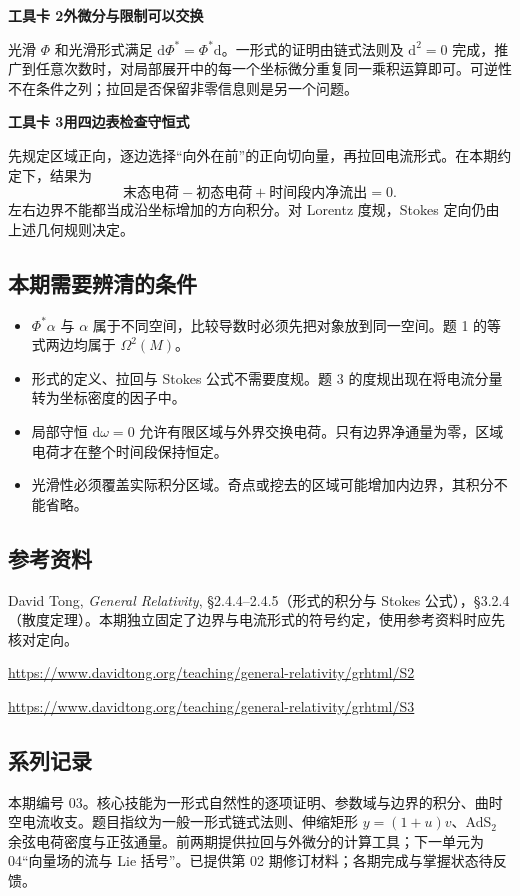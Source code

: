 \documentclass[11pt,a4paper]{article}
\newcommand{\D}{\mathrm d}
\begin{document}
\textbf{工具卡 2\quad 外微分与限制可以交换}\par
光滑 $\Phi$ 和光滑形式满足 $\D\Phi^*=\Phi^*\D$。一形式的证明由链式法则及 $\D^2=0$ 完成，推广到任意次数时，对局部展开中的每一个坐标微分重复同一乘积运算即可。可逆性不在条件之列；拉回是否保留非零信息则是另一个问题。

\textbf{工具卡 3\quad 用四边表检查守恒式}\par
先规定区域正向，逐边选择“向外在前”的正向切向量，再拉回电流形式。在本期约定下，结果为
\[
 \text{末态电荷}-\text{初态电荷}
 +\text{时间段内净流出}=0 .
\]
左右边界不能都当成沿坐标增加的方向积分。对 Lorentz 度规，Stokes 定向仍由上述几何规则决定。

\subsection*{本期需要辨清的条件}
\begin{itemize}
\item $\Phi^*\alpha$ 与 $\alpha$ 属于不同空间，比较导数时必须先把对象放到同一空间。题 1 的等式两边均属于 $\Omega^2(M)$。
\item 形式的定义、拉回与 Stokes 公式不需要度规。题 3 的度规出现在将电流分量转为坐标密度的因子中。
\item 局部守恒 $\D\omega=0$ 允许有限区域与外界交换电荷。只有边界净通量为零，区域电荷才在整个时间段保持恒定。
\item 光滑性必须覆盖实际积分区域。奇点或挖去的区域可能增加内边界，其积分不能省略。
\end{itemize}

\subsection*{参考资料}
David Tong, \textit{General Relativity}, \S2.4.4--2.4.5（形式的积分与 Stokes 公式），\S3.2.4（散度定理）。本期独立固定了边界与电流形式的符号约定，使用参考资料时应先核对定向。\par
\url{https://www.davidtong.org/teaching/general-relativity/grhtml/S2}\par
\url{https://www.davidtong.org/teaching/general-relativity/grhtml/S3}

\subsection*{系列记录}
本期编号 03。核心技能为一形式自然性的逐项证明、参数域与边界的积分、曲时空电流收支。题目指纹为一般一形式链式法则、伸缩矩形 $y=(1+u)v$、AdS$_2$ 余弦电荷密度与正弦通量。前两期提供拉回与外微分的计算工具；下一单元为 04“向量场的流与 Lie 括号”。已提供第 02 期修订材料；各期完成与掌握状态待反馈。
\end{document}
